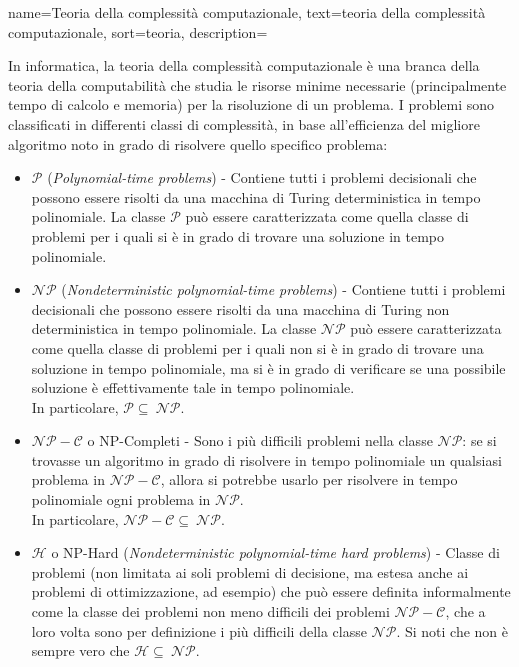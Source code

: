 {
    name=Teoria della complessità computazionale,
    text=teoria della complessità computazionale,
    sort=teoria,
    description={In informatica, la teoria della complessità computazionale è una branca della teoria della computabilità che studia le risorse minime necessarie (principalmente tempo di calcolo e memoria) per la risoluzione di un problema. I problemi sono classificati in differenti classi di complessità, in base all'efficienza del migliore algoritmo noto in grado di risolvere quello specifico problema:
    \begin{itemize}
        \item $\mathcal{P}$ (\textit{Polynomial-time problems}) - Contiene tutti i problemi decisionali che possono essere risolti da una macchina di Turing deterministica in tempo polinomiale. La classe $\mathcal{P}$ può essere caratterizzata come quella classe di problemi per i quali si è in grado di trovare una soluzione in tempo polinomiale.
        \item $\mathcal{NP}$ (\textit{Nondeterministic polynomial-time problems}) - Contiene tutti i problemi decisionali che possono essere risolti da una macchina di Turing non deterministica in tempo polinomiale. La classe $\mathcal{NP}$ può essere caratterizzata come quella classe di problemi per i quali non si è in grado di trovare una soluzione in tempo polinomiale, ma si è in grado di verificare se una possibile soluzione è effettivamente tale in tempo polinomiale. \\ In particolare, $\mathcal{P} \subseteq\ \mathcal{NP}$.
        \item $\mathcal{NP-C}$ o NP-Completi - Sono i più difficili problemi nella classe $\mathcal{NP}$: se si trovasse un algoritmo in grado di risolvere in tempo polinomiale un qualsiasi problema in $\mathcal{NP-C}$, allora si potrebbe usarlo per risolvere in tempo polinomiale ogni problema in $\mathcal{NP}$. \\ In particolare, $\mathcal{NP-C} \subseteq\ \mathcal{NP}$.
        \item $\mathcal{H}$ o NP-Hard (\textit{Nondeterministic polynomial-time hard problems}) -  Classe di problemi (non limitata ai soli problemi di decisione, ma estesa anche ai problemi di ottimizzazione, ad esempio) che può essere definita informalmente come la classe dei problemi non meno difficili dei problemi $\mathcal{NP-C}$, che a loro volta sono per definizione i più difficili della classe $\mathcal{NP}$. Si noti che non è sempre vero che $\mathcal{H} \subseteq\ \mathcal{NP}$.
    \end{itemize}
    \cite{wiki:teoria-compl}
    }
}


